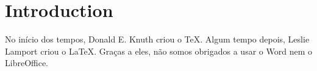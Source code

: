 \documentclass[cic,tc,english]{iiufrgs}
\begin{document}

\tableofcontents


\chapter{Introduction}
No início dos tempos, Donald E. Knuth criou o \TeX. Algum tempo depois, Leslie Lamport criou o \LaTeX. Graças a eles, não somos obrigados a usar o Word nem o LibreOffice.





\end{document}

